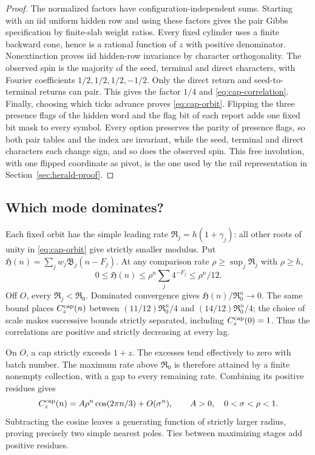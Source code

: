 \begin{proof}
The normalized factors have configuration-independent sums. Starting with an iid uniform hidden row and using these factors gives the pair Gibbs specification by finite-slab weight ratios. Every fixed cylinder uses a finite backward cone, hence is a rational function of \(z\) with positive denominator. Nonextinction proves iid hidden-row invariance by character orthogonality. The observed spin is the majority of the seed, terminal and direct characters, with Fourier coefficients \(1/2,1/2,1/2,-1/2\). Only the direct return and seed-to-terminal returns can pair. This gives the factor \(1/4\) and \eqref{eq:cap-correlation}. Finally, choosing which ticks advance proves \eqref{eq:cap-orbit}. Flipping the three presence flags of the hidden word and the flag bit of each report adds one fixed bit mask to every symbol. Every option preserves the parity of presence flags, so both pair tables and the index are invariant, while the seed, terminal and direct characters each change sign, and so does the observed spin. This free involution, with one flipped coordinate as pivot, is the one used by the rail representation in Section~\ref{sec:herald-proof}.
\end{proof}

\subsection{Which mode dominates?}\label{sec:cap-modes}

Each fixed orbit has the simple leading rate \(\mathfrak R_j=h(1+\gamma_j)\): all other roots of unity in \eqref{eq:cap-orbit} give strictly smaller modulus. Put \(\mathfrak H(n)=\sum_j w_j\mathfrak B_j(n-F_j)\). At any comparison rate \(\rho\ge\sup_j\mathfrak R_j\) with \(\rho\ge h\),
\[
 0\le\mathfrak H(n)\le\rho^n\sum_j4^{-F_j}\le\rho^n/12.
\]
Off \(O\), every \(\mathfrak R_j<\mathfrak R_0\). Dominated convergence gives \(\mathfrak H(n)/\mathfrak R_0^n\to0\). The same bound places \(C^{\rm cap}_z(n)\) between \((11/12)\mathfrak R_0^n/4\) and \((14/12)\mathfrak R_0^n/4\); the choice of scale makes successive bounds strictly separated, including \(C^{\rm cap}_z(0)=1\). Thus the correlations are positive and strictly decreasing at every lag.

On \(O\), a cap strictly exceeds \(1+z\). The excesses tend effectively to zero with batch number. The maximum rate above \(\mathfrak R_0\) is therefore attained by a finite nonempty collection, with a gap to every remaining rate. Combining its positive residues gives
\[
 C^{\rm cap}_z(n)=A\rho^n\cos(2\pi n/3)+O(\sigma^n),
 \qquad A>0,\quad 0<\sigma<\rho<1.
\]
Subtracting the cosine leaves a generating function of strictly larger radius, proving precisely two simple nearest poles. Ties between maximizing stages add positive residues.

